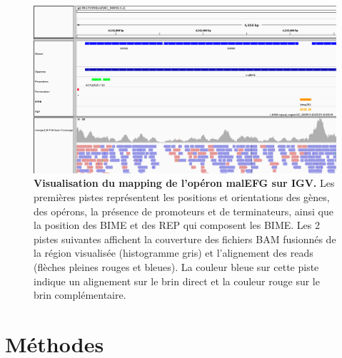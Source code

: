 \documentclass[12pt,a4paper]{report}
\begin{document}
\begin{onehalfspace}
\begin{figure}[ht]
\centerline{\includegraphics[scale=0.4]{figures/igv_snapshot.png}}
\caption{\textbf{Visualisation du mapping de l'opéron malEFG sur IGV.} Les premières pistes représentent les positions et orientations des gènes, des opérons, la présence de promoteurs et de terminateurs, ainsi que la position des BIME et des REP qui composent les BIME. Les 2 pistes suivantes affichent la couverture des fichiers BAM fusionnés de la région visualisée (histogramme gris) et l'alignement des reads (flèches pleines rouges et bleues). La couleur bleue sur cette piste indique un alignement sur le brin direct et la couleur rouge sur le brin complémentaire.}
\label{fig:igv} 
\end{figure}

\section*{Méthodes}


\end{onehalfspace}
\end{document}
